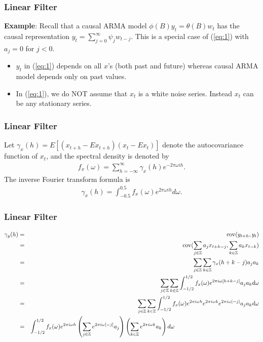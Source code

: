 \documentclass[%
xcolor=pdftex]{beamer}
\begin{document}
\begin{frame}
\frametitle{Linear Filter}

\textbf{Example}: Recall that a causal ARMA model
$\phi(B)y_t =\theta(B)w_t$ has the causal representation
$y_t=\sum^\infty_{j=0}\psi_j w_{t-j}$. This is a special case
of (\ref{eq:1}) with $a_j=0$ for $j<0$. 

\begin{itemize}

\item $y_t$ in
(\ref{eq:1}) depends on all $x$'s (both past and future)
whereas causal ARMA model depends only on past values. 

\item In (\ref{eq:1}), we do NOT assume that $x_t$ is a white noise
series. Instead $x_t$ can be any stationary series.

\end{itemize}

\end{frame}

\begin{frame}
\frametitle{Linear Filter}

Let $\gamma_x(h)=E[(x_{t+h}-Ex_{t+h})(x_t-Ex_t)]$ denote the
autocovariance function of $x_t$, and the spectral density is denoted by
\begin{eqnarray*}
 f_x(\omega) = \sum^\infty_{h=-\infty} \gamma_x(h)e^{-2\pi \omega i h}.
 \end{eqnarray*}
The inverse Fourier transform formula is
\begin{eqnarray*}
 \gamma_x(h) = \int^{0.5}_{-0.5} f_x(\omega) e^{2\pi \omega i h} d\omega.
 \end{eqnarray*}

\end{frame}

\begin{frame}
\frametitle{Linear Filter}

\begin{eqnarray} 
\gamma_y(h) &=& \text{cov}(y_{t+h}, y_t) \nonumber \\
            &=& \text{cov}(\sum_{j \in \mathbb{Z} } a_j x_{t+h-j}, \sum_{k \in \mathbb{Z} } a_k x_{t-k})  \nonumber \\
            &=& \sum_{j \in \mathbb{Z} }\sum_{k \in \mathbb{Z} } \gamma_x(h+k-j ) a_j a_k \nonumber \\
            &=& \sum_{j \in \mathbb{Z} }\sum_{k \in \mathbb{Z} } \int_{-1/2}^{1/2} f_x(\omega)e^{2\pi i\omega [h+k-j] } a_j a_k d \omega \nonumber \\
            &=& \sum_{j \in \mathbb{Z} }\sum_{k \in \mathbb{Z} } \int_{-1/2}^{1/2} f_x(\omega)e^{2\pi i \omega  h }e^{2\pi i \omega  k}e^{2\pi i\omega [-j]}  a_j a_k d \omega \nonumber \\
            &=& \int_{-1/2}^{1/2} f_x(\omega) e^{2\pi i\omega h }\left(\sum_{j \in \mathbb{Z} } e^{2\pi i\omega [-j]} a_j \right) \left(\sum_{k \in \mathbb{Z} } e^{2\pi i\omega k}a_k \right)d \omega  \hspace{50mm} \nonumber \\
\end{eqnarray}

\end{frame}
\end{document}
